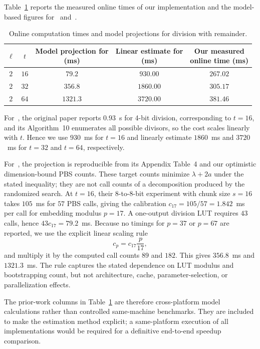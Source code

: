 Table~\ref{tab:div_time} reports the measured online times of our implementation
and the model-based figures for~\cite{BBR26} and~\cite{OKC21}.

\begin{table}[!tbp]
  \centering
  \small
  \caption{Online computation times and model projections for division with
  remainder.}
  \label{tab:div_time}
  \begin{tabular}{c|c|c|c|c}
    \hline
    $\ell$ & $t$
    & \makecell{Model projection for\\\cite{BBR26} (ms)}
    & \makecell{Linear estimate for\\\cite{OKC21} (ms)}
    & \makecell{Our measured\\online time (ms)} \\
    \hline
    $2$ & $16$ & $79.2$   & $930.00$  & $267.02$ \\
    $2$ & $32$ & $356.8$  & $1860.00$ & $305.17$ \\
    $2$ & $64$ & $1321.3$ & $3720.00$ & $381.46$ \\
    \hline
  \end{tabular}
\end{table}

For~\cite{OKC21}, the original paper reports $0.93$~s for 4-bit division,
corresponding to $t=16$, and its Algorithm~10 enumerates all possible divisors,
so the cost scales linearly with $t$. Hence we use $930$~ms for $t=16$ and
linearly estimate $1860$~ms and $3720$~ms for $t=32$ and $t=64$, respectively.

For~\cite{BBR26}, the projection is reproducible from its Appendix Table~4 and
our optimistic dimension-bound PBS counts. These target counts minimize
$\lambda+2a$ under the stated inequality; they are not call counts of a
decomposition produced by the randomized search. At $t=16$, their 8-to-8-bit
experiment with chunk size $s=16$ takes $105$~ms for $57$ PBS calls, giving the
calibration $c_{17}=105/57=1.842$~ms per call for embedding modulus $p=17$. A
one-output division LUT requires $43$ calls, hence $43c_{17}=79.2$~ms. Because
no timings for $p=37$ or $p=67$ are reported, we use the explicit linear scaling
rule
\[
c_p=c_{17}\frac{p}{17},
\]
and multiply it by the computed call counts $89$ and $182$. This gives
$356.8$~ms and $1321.3$~ms. The rule captures the stated dependence on LUT
modulus and bootstrapping count, but not architecture, cache,
parameter-selection, or parallelization effects.

The prior-work columns in Table~\ref{tab:div_time} are therefore cross-platform
model calculations rather than controlled same-machine benchmarks. They are
included to make the estimation method explicit; a same-platform execution of
all implementations would be required for a definitive end-to-end speedup
comparison.

